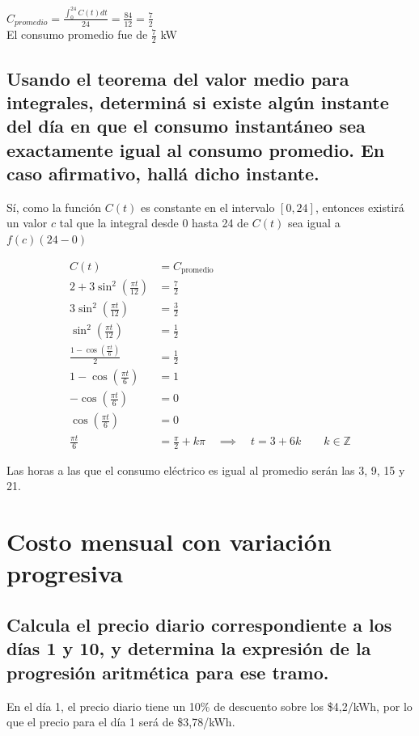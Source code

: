 \documentclass[11pt, a4paper]{article}
\begin{document}
$C_{promedio} = \frac{\int_{0}^{24} C(t)dt}{24} = \frac{84}{12} = \frac{7}{2}$\\

El consumo promedio fue de $\frac{7}{2}$ kW

\subsection{Usando el teorema del valor medio para integrales, determiná si existe algún instante del día en que el consumo instantáneo sea exactamente igual al consumo promedio. En caso afirmativo, hallá dicho instante.}

Sí, como la función $C(t)$ es constante en el intervalo $[0,24]$, entonces existirá un valor $c$ tal que la integral desde 0 hasta 24 de $C(t)$ sea igual a $f(c)(24 - 0)$

\begin{align*}
    C(t) &= C_{\text{promedio}} \\
    2 + 3\sin^2\left(\frac{\pi t}{12}\right) &= \frac{7}{2} \\
    3\sin^2\left(\frac{\pi t}{12}\right) &= \frac{3}{2} \\
    \sin^2\left(\frac{\pi t}{12}\right) &= \frac{1}{2} \\
    \frac{1 - \cos\left(\frac{\pi t}{6}\right)}{2} &= \frac{1}{2} \\
    1 - \cos\left(\frac{\pi t}{6}\right) &= 1 \\
    -\cos\left(\frac{\pi t}{6}\right) &= 0 \\
    \cos\left(\frac{\pi t}{6}\right) &= 0 \\
    \frac{\pi t}{6} &= \frac{\pi}{2} + k \pi \quad \implies \quad t = 3 + 6k \qquad k \in \mathbb{Z}
\end{align*}

Las horas a las que el consumo eléctrico es igual al promedio serán las 3, 9, 15 y 21.

\section{Costo mensual con variación progresiva}
\subsection{Calcula el precio diario correspondiente a los días 1 y 10, y determina la expresión de la progresión aritmética para ese tramo.}

En el día 1, el precio diario tiene un 10\% de descuento sobre los \$4,2/kWh, por lo que el precio para el día 1 será de \$3,78/kWh. \\
\end{document}
